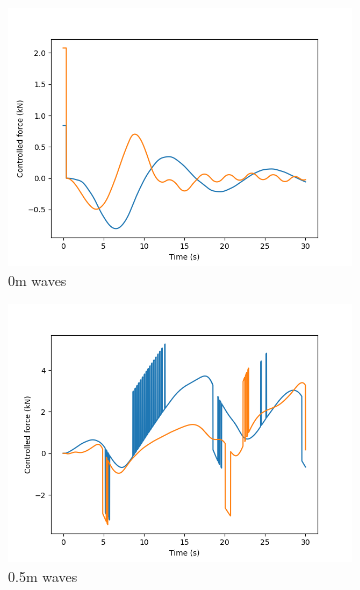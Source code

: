 \documentclass[class=article, crop=false]{standalone}
\begin{document}
\begin{figure}
    \centering
    \begin{subfigure}{0.65\textwidth}
        \centering
        \includegraphics{scenario1/rov-50m/0.0m/usv_forces}
        \caption{0m waves}
    \end{subfigure}
    \vfill
    \begin{subfigure}{0.65\textwidth}
        \centering
        \includegraphics{scenario1/rov-50m/0.5m/usv_forces}
        \caption{0.5m waves}
    \end{subfigure}
    \vfill
    \begin{subfigure}{0.65\textwidth}
        \centering

\end{subfigure}
\end{figure}
\end{document}
